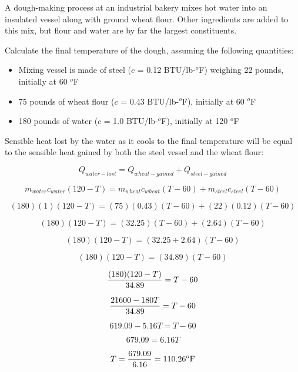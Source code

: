 

A dough-making process at an industrial bakery mixes hot water into an insulated vessel along with ground wheat flour.  Other ingredients are added to this mix, but flour and water are by far the largest constituents.

\vskip 10pt

Calculate the final temperature of the dough, assuming the following quantities:

\begin{itemize}
\item{} Mixing vessel is made of steel ($c$ = 0.12 BTU/lb-$^{o}$F) weighing 22 pounds, initially at 60 $^{o}$F
\vskip 10pt
\item{} 75 pounds of wheat flour ($c$ = 0.43 BTU/lb-$^{o}$F), initially at 60 $^{o}$F
\vskip 10pt
\item{} 180 pounds of water ($c$ = 1.0 BTU/lb-$^{o}$F), initially at 120 $^{o}$F
\end{itemize}







Sensible heat lost by the water as it cools to the final temperature will be equal to the sensible heat gained by both the steel vessel and the wheat flour:

$$Q_{water-lost} = Q_{wheat-gained} + Q_{steel-gained}$$

$$m_{water}c_{water} (120 - T) = m_{wheat}c_{wheat} (T - 60) + m_{steel}c_{steel} (T - 60)$$

$$(180)(1)(120 - T) = (75)(0.43)(T - 60) + (22)(0.12)(T - 60)$$

$$(180)(120 - T) = (32.25)(T - 60) + (2.64)(T - 60)$$

$$(180)(120 - T) = (32.25 + 2.64)(T - 60)$$

$$(180)(120 - T) = (34.89)(T - 60)$$

$${(180)(120 - T) \over 34.89} = T - 60$$

$${21600 - 180 T \over 34.89} = T - 60$$

$$619.09 - 5.16 T = T - 60$$

$$679.09 = 6.16 T$$

$$T = {679.09 \over 6.16} = 110.26^o \hbox{F}$$











